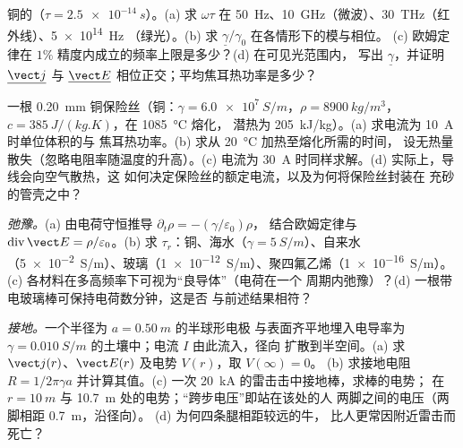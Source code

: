 \begin{exercise}[$\star\star$]\label{exo:b2:charges-currents-conduction:7}
铜的（$\tau = \qty{2.5e-14}{s}$）。(a) 求 $\omega\tau$ 在
\qty{50}{Hz}、\qty{10}{GHz}（微波）、\qty{30}{THz}（红外线）、\qty{5e14}{Hz}
（绿光）。(b) 求 $\underline\gamma/\gamma_0$ 在各情形下的模与相位。
(c) 欧姆定律在 $1\%$ 精度内成立的频率上限是多少？(d) 在可见光范围内，
写出 $\underline\gamma$，并证明 $\underline{\vect j}$ 与
$\underline{\vect E}$ 相位正交；平均焦耳热功率是多少？
\end{exercise}

\begin{exercise}[$\star\star$]\label{exo:b2:charges-currents-conduction:8}
一根 \qty{0.20}{mm} 铜保险丝（铜：$\gamma = \qty{6.0e7}{S/m}$，$\rho =
\qty{8900}{kg/m^3}$，$c = \qty{385}{J/(kg.K)}$，在 \qty{1085}{\degreeCelsius} 熔化，
潜热为 \qty{205}{kJ/kg}）。(a) 求电流为 \qty{10}{A} 时单位体积的与
焦耳热功率。(b) 求从 \qty{20}{\degreeCelsius} 加热至熔化所需的时间，
设无热量散失（忽略电阻率随温度的升高）。(c)
电流为 \qty{30}{A} 时同样求解。(d) 实际上，导线会向空气散热，这
如何决定保险丝的额定电流，以及为何将保险丝封装在
充砂的管壳之中？
\end{exercise}

\begin{exercise}[$\star\star$]\label{exo:b2:charges-currents-conduction:9}
\emph{弛豫。}(a) 由电荷守恒推导 $\partial_t\rho = -(\gamma/\varepsilon_0)\rho$，
结合欧姆定律与 $\operatorname{div}\vect E = \rho/\varepsilon_0$。(b)
求 $\tau_r$：铜、海水（$\gamma = \qty{5}{S/m}$）、自来水
（\qty{5e-2}{S/m}）、玻璃（\qty{1e-12}{S/m}）、聚四氟乙烯（\qty{1e-16}{S/m}）。(c)
各材料在多高频率下可视为“良导体”（电荷在一个
周期内弛豫）？(d) 一根带电玻璃棒可保持电荷数分钟，这是否
与前述结果相符？
\end{exercise}

\begin{exercise}[$\star\star\star$]\label{exo:b2:charges-currents-conduction:10}
\emph{接地。}一个半径为 $a = \qty{0.50}{m}$ 的半球形电极
与表面齐平地埋入电导率为 $\gamma =
\qty{0.010}{S/m}$ 的土壤中；电流 $I$ 由此流入，径向
扩散到半空间。(a) 求 $\vect j(r)$、$\vect E(r)$ 及电势 $V(r)$，取 $V(\infty) = 0$。
(b) 求接地电阻 $R = 1/2\pi\gamma a$ 并计算其值。(c) 一次
\qty{20}{kA} 的雷击击中接地棒，求棒的电势；
在 $r = \qty{10}{m}$ 与 \qty{10.7}{m} 处的电势；“跨步电压”即站在该处的人
两脚之间的电压（两脚相距 \qty{0.7}{m}，沿径向）。
(d) 为何四条腿相距较远的牛，
比人更常因附近雷击而死亡？
\end{exercise}

